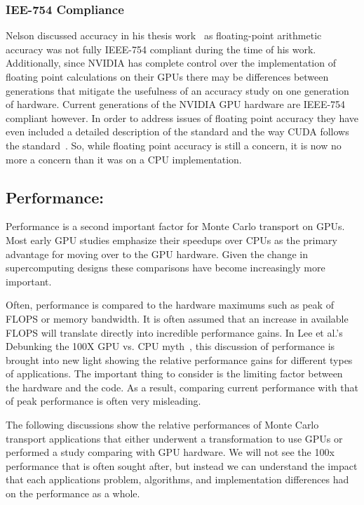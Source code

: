 \subsubsection*{\textbf{IEE-754 Compliance}}
Nelson discussed accuracy in his thesis work~\cite{nelson2009monte} as floating-point arithmetic accuracy was not fully IEEE-754 compliant during the time of his work.
%
Additionally, since NVIDIA has complete control over the implementation of floating point calculations on their GPUs there may be differences between generations that mitigate the usefulness of an accuracy study on one generation of hardware.
%
Current generations of the NVIDIA GPU hardware are IEEE-754 compliant however. 
%
In order to address issues of floating point accuracy they have even included a detailed description of the standard and the way CUDA follows the standard~\cite{cudaToolkitv7.5}.
So,  while floating point accuracy is still a concern, it is now no more a concern than it was on a CPU implementation.

\subsection*{\textbf{Performance:}}

Performance is a second important factor for Monte Carlo transport on GPUs.
%
Most early GPU studies emphasize their speedups over CPUs as the primary advantage for moving over to the GPU hardware.
%
Given the change in supercomputing designs these comparisons have become increasingly more important.
%

%
Often, performance is compared to the hardware maximums such as peak of FLOPS or memory bandwidth.
%
It is often assumed that an increase in available FLOPS will translate directly into incredible performance gains.
%
In Lee et al.'s Debunking the 100X GPU vs. CPU myth~\cite{lee2010debunking}, this discussion of performance is brought into new light showing the relative performance gains for different types of applications.
%
The important thing to consider is the limiting factor between the hardware and the code.
%
As a result, comparing current performance with that of peak performance is often very misleading.
%

%
The following discussions show the relative performances of Monte Carlo transport applications that either underwent a transformation to use GPUs or performed a study comparing with GPU hardware.
%
We will not see the 100x performance that is often sought after, but instead we can understand the impact that each applications problem, algorithms, and implementation differences had on the performance as a whole.
%

